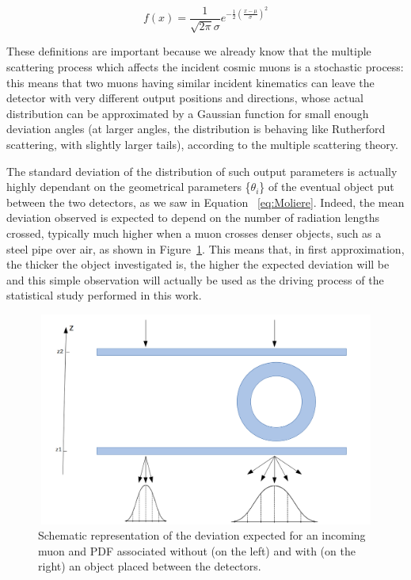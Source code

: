 \documentclass[a4paper, 11pt]{report}
\begin{document}
\begin{equation}
\label{eq:gauss}
f(x) = \frac{1}{\sqrt{2 \pi} \sigma} e^{-\frac{1}{2} \left (\frac{x - \mu}{\sigma} \right )^2}
\end{equation}

These definitions are important because we already know that the multiple scattering process which affects the incident cosmic muons is a stochastic process: this means that two muons having similar incident kinematics can leave the detector with very different output positions and directions, whose actual distribution can be approximated by a Gaussian function for small enough deviation angles (at larger angles, the distribution is behaving like Rutherford scattering, with slightly larger tails), according to the multiple scattering theory. 

The standard deviation of the distribution of such output parameters is actually highly dependant on the geometrical parameters \{$\theta_i$\} of the eventual object put between the two detectors, as we saw in Equation ~\ref{eq:Moliere}. Indeed, the mean deviation observed is expected to depend on the number of radiation lengths crossed, typically much higher when a muon crosses denser objects, such as a steel pipe over air, as shown in Figure~\ref{fig:deviation}. This means that, in first approximation, the thicker the object investigated is, the higher the expected deviation will be and this simple observation will actually be used as the driving process of the statistical study performed in this work.

\begin{figure}[htbp]
\centering
\includegraphics[width=11.5cm, height=7cm]{figs/pdfs.png}
\caption{Schematic representation of the deviation expected for an incoming muon and PDF associated without (on the left) and with (on the right) an object placed between the detectors.}
\label{fig:deviation}
\end{figure}
\end{document}
